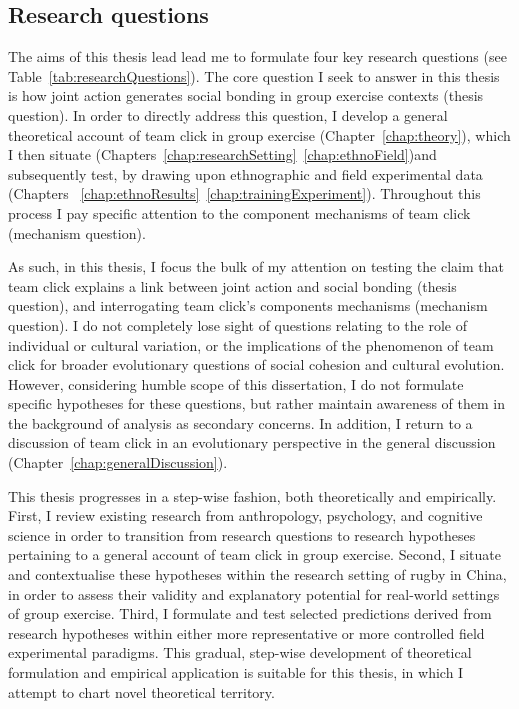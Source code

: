 \begin{CJK}{UTF8}{gbsn}
\subsection{Research questions}
The aims of this thesis lead lead me to formulate four key research questions  (see Table~\ref{tab:researchQuestions}).  The core question I seek to answer in this thesis is how joint action generates social bonding in group exercise contexts (thesis question).  In order to directly address this question, I develop a general theoretical account of team click in group exercise (Chapter~\ref{chap:theory}), which I then situate (Chapters~\ref{chap:researchSetting}\nobreakdash~\ref{chap:ethnoField})and subsequently test, by drawing upon ethnographic and field experimental data (Chapters ~\ref{chap:ethnoResults}\nobreakdash~\ref{chap:trainingExperiment}).  Throughout this process I pay specific attention to the component mechanisms of team click (mechanism question).



As such, in this thesis, I focus the bulk of my attention on testing the claim that team click explains a link between joint action and social bonding (thesis question), and interrogating team click's components mechanisms (mechanism question).   I do not completely lose sight of questions relating to the role of individual or cultural variation, or the implications of the phenomenon of team click for broader evolutionary questions of social cohesion and cultural evolution.  However, considering humble scope of this dissertation, I do not formulate specific hypotheses for these questions, but rather maintain awareness of them in the background of analysis as secondary concerns.  In addition, I return to a discussion of team click in an evolutionary perspective in the general discussion (Chapter~\ref{chap:generalDiscussion}).

This thesis progresses in a step-wise fashion, both theoretically and empirically.  First, I review existing research from anthropology, psychology, and cognitive science in order to transition from research questions to research hypotheses pertaining to a general account of team click in group exercise.  Second, I situate and contextualise these hypotheses within the research setting of rugby in China, in order to assess their validity and explanatory potential for real-world settings of group exercise.  Third, I formulate and test selected predictions derived from research hypotheses within either more representative or more controlled field experimental paradigms.
This gradual, step-wise development of theoretical formulation and empirical application is suitable for this thesis, in which I attempt to chart novel theoretical territory.



\end{CJK}
